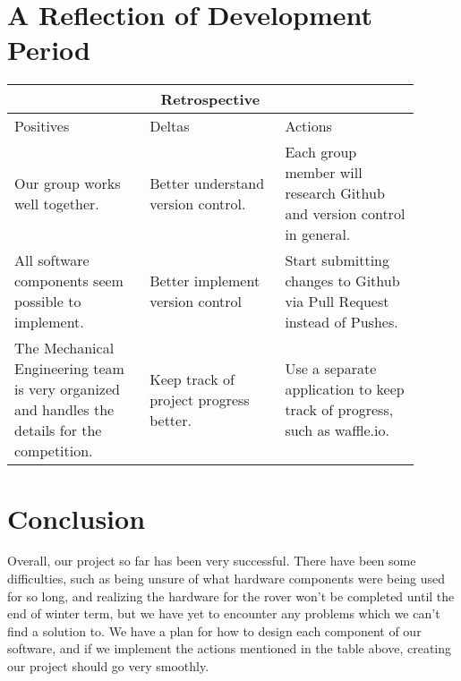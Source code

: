\documentclass[10pt,letterpaper,onecolumn,draftclsnofoot,journal]{IEEEtran}
\begin{document}
\section{A Reflection of Development Period}
\begin{tabular}{ |p{0.3\linewidth}|p{0.3\linewidth}|p{0.3\linewidth}|  }
\hline
\multicolumn{3}{|c|}{Retrospective} \\
\hline
Positives& Deltas &Actions \\
\hline
Our group works well together. &
Better understand version control.&
Each group member will research Github and version control in general. \\

All software components seem possible to implement. &
Better implement version control &
Start submitting changes to Github via Pull Request instead of Pushes. \\

The Mechanical Engineering team is very organized and handles the details for the competition. &
Keep track of project progress better. & Use a separate application to keep track of progress, such as waffle.io.  \\
\hline
\end{tabular}

\section{Conclusion}
Overall, our project so far has been very successful. There have been some difficulties, such as being unsure of what hardware components were being used for so long, and realizing the hardware for the rover won't be completed until the end of winter term, but we have yet to encounter any problems which we can't find a solution to. We have a plan for how to design each component of our software, and if we implement the actions mentioned in the table above, creating our project should go very smoothly.


%
%
\end{document}
